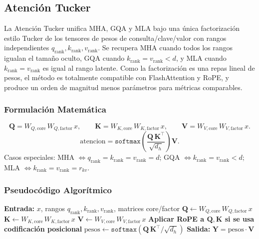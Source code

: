 \subsection{Atención Tucker}
La Atención Tucker \citep{klein_tucker_2026} unifica MHA, GQA y MLA bajo una única factorización estilo Tucker de los tensores de pesos de consulta/clave/valor con rangos independientes $q_{\text{rank}}, k_{\text{rank}}, v_{\text{rank}}$. Se recupera MHA cuando todos los rangos igualan el tamaño oculto, GQA cuando $k_{\text{rank}} = v_{\text{rank}} < d$, y MLA cuando $k_{\text{rank}} = v_{\text{rank}}$ es igual al rango latente. Como la factorización es una repas lineal de pesos, el método es totalmente compatible con FlashAttention y RoPE, y produce un orden de magnitud menos parámetros para métricas comparables.

\subsubsection{Formulación Matemática}
\[
\mathbf{Q} = W_{Q,\text{core}}\, W_{Q,\text{factor}}\, x, \qquad
\mathbf{K} = W_{K,\text{core}}\, W_{K,\text{factor}}\, x, \qquad
\mathbf{V} = W_{V,\text{core}}\, W_{V,\text{factor}}\, x.
\]
\[
\text{atencion} = \texttt{softmax}\!\left(\frac{\mathbf{Q}\, \mathbf{K}^\top}{\sqrt{d_h}}\right) \mathbf{V}.
\]
Casos especiales: MHA $\Leftrightarrow q_{\text{rank}} = k_{\text{rank}} = v_{\text{rank}} = d$; GQA $\Leftrightarrow k_{\text{rank}} = v_{\text{rank}} < d$; MLA $\Leftrightarrow k_{\text{rank}} = v_{\text{rank}} = r_{kv}$.

\subsubsection{Pseudocódigo Algorítmico}
\begin{algorithmic}[1]
\State \textbf{Entrada:} $x$, rangos $q_{\text{rank}}, k_{\text{rank}}, v_{\text{rank}}$, matrices core/factor
\State $\mathbf{Q} \gets W_{Q,\text{core}}\, W_{Q,\text{factor}}\, x$ 
\State $\mathbf{K} \gets W_{K,\text{core}}\, W_{K,\text{factor}}\, x$ 
\State $\mathbf{V} \gets W_{V,\text{core}}\, W_{V,\text{factor}}\, x$ 
\State \textbf{Aplicar RoPE a $\mathbf{Q}, \mathbf{K}$ si se usa codificación posicional}
\State $\text{pesos} \gets \texttt{softmax}(\mathbf{Q}\, \mathbf{K}^\top / \sqrt{d_h})$ 
\State \textbf{Salida:} $\mathbf{Y} = \text{pesos} \cdot \mathbf{V}$
\end{algorithmic}

